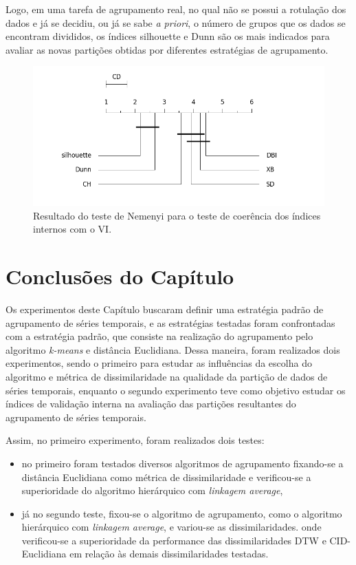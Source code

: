 Logo, em uma tarefa de agrupamento real, no qual não se possui a rotulação dos dados e já se decidiu, ou já se sabe \emph{a priori}, o número de grupos que os dados se encontram divididos, os índices silhouette e Dunn são os mais indicados para avaliar as novas partições obtidas por diferentes estratégias de agrupamento.

 \begin{figure}[h!]
 	\includegraphics[width=\linewidth]{figuras/best_coherence.png}
 	\caption{Resultado do teste de Nemenyi para o teste de coerência dos índices internos com o VI.}
 	\label{fig:coherence}
 \end{figure}

\section{Conclusões do Capítulo}

Os experimentos deste Capítulo buscaram definir uma estratégia padrão de agrupamento de séries temporais, e as estratégias testadas foram confrontadas com a estratégia padrão, que consiste na realização do agrupamento pelo algoritmo \emph{k-means} e distância Euclidiana. Dessa maneira, foram realizados dois experimentos, sendo o primeiro para estudar as influências da escolha do algoritmo e métrica de dissimilaridade na qualidade da partição de dados de séries temporais, enquanto o segundo experimento teve como objetivo estudar os índices de validação interna na avaliação das partições resultantes do agrupamento de séries temporais.

Assim, no primeiro experimento, foram realizados dois testes:
\begin{itemize}
	\item no primeiro foram testados diversos algoritmos de agrupamento fixando-se a distância Euclidiana como métrica de dissimilaridade e verificou-se a superioridade do algoritmo hierárquico com \emph{linkagem average},
	\item já no segundo teste, fixou-se o algoritmo de agrupamento, como o algoritmo hierárquico com \emph{linkagem average}, e variou-se as dissimilaridades. onde  verificou-se a superioridade da performance das dissimilaridades DTW e CID-Euclidiana em relação às demais dissimilaridades testadas.
\end{itemize}

